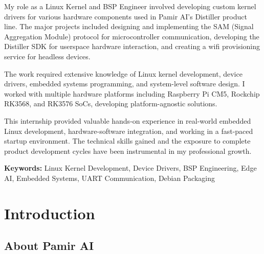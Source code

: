 \documentclass[12pt,a4paper]{report}
\begin{document}
\vspace{0.5cm}

My role as a Linux Kernel and BSP Engineer involved developing custom kernel drivers for various hardware components used in Pamir AI's Distiller product line. The major projects included designing and implementing the SAM (Signal Aggregation Module) protocol for microcontroller communication, developing the Distiller SDK for userspace hardware interaction, and creating a wifi provisioning service for headless devices.

\vspace{0.5cm}

The work required extensive knowledge of Linux kernel development, device drivers, embedded systems programming, and system-level software design. I worked with multiple hardware platforms including Raspberry Pi CM5, Rockchip RK3568, and RK3576 SoCs, developing platform-agnostic solutions.

\vspace{0.5cm}

This internship provided valuable hands-on experience in real-world embedded Linux development, hardware-software integration, and working in a fast-paced startup environment. The technical skills gained and the exposure to complete product development cycles have been instrumental in my professional growth.

\vspace{1cm}

\noindent
\textbf{Keywords:} Linux Kernel Development, Device Drivers, BSP Engineering, Edge AI, Embedded Systems, UART Communication, Debian Packaging

\newpage
\tableofcontents

\newpage
{}

\chapter{Introduction}

\section{About Pamir AI}
\end{document}
